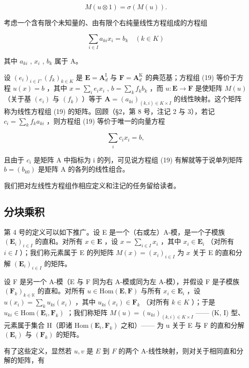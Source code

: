 \[
M (u \otimes 1) = \sigma (M (u)).
\]

考虑一个含有限个未知量的、由有限个右纯量线性方程组成的方程组

\[
\sum_ {i \in I} a _ {k i} x _ {i} = b _ {k} \quad (k \in K)\tag{19}
\]

其中 \(a_{ki}\) , \(x_{i}\) , \(b_{k}\) 属于 A。

设 \((e_i)_{i\in I}, (f_k)_{k\in K}\) 是 \(\mathbf{E} = \mathbf{A}_d^{\mathrm{I}}\) 与 \(\mathbf{F} = \mathbf{A}_d^{\mathrm{K}}\) 的典范基；方程组 (19) 等价于方程 \(u(x) = b\) ，其中 \(x = \sum_{i} e_i x_i\) , \(b = \sum_{k} f_k b_k\) ，而 \(u: \mathbf{E} \to \mathbf{F}\) 是使矩阵 \(M(u)\) （关于基 \((e_i)\) 与 \((f_k)\) ）等于 \(\mathbf{A} = (a_{ki})_{(k,i)\in K\times I}\) 的线性映射。这个矩阵称为线性方程组 (19) 的矩阵。回顾（§2，第 8 号，注记 2 与 3），若记 \(c_i = \sum_{k} f_k a_{ki}\) ，则方程组 (19) 等价于唯一的向量方程

\[
\sum_ {i} c _ {i} x _ {i} = b,\tag{20}
\]

且由于 \(c_{i}\) 是矩阵 A 中指标为 i 的列，可见说方程组 (19) 有解就等于说单列矩阵 \(b = (b_{k0})\) 是矩阵 A 的各列的线性组合。

我们把对左线性方程组作相应定义和注记的任务留给读者。

\subsection{分块乘积}

第 4 号的定义可以如下推广。设 E 是一个（右或左）A-模，是一个子模族 \((\mathbf{E}_i)_{i\in I}\) 的直和。对所有 \(x\in \mathbf{E}\) ，设 \(x = \sum_{i\in I}x_i\) ，其中 \(x_{i}\in \mathbf{E}_{i}\) （对所有 \(i\in I\) ）；我们称元素属于 E 的列矩阵 \(M(x) = (x_{i})_{i\in I}\) 为 \(x\) 关于 E 的直和分解 \((\mathbf{E}_i)_{i\in I}\) 的矩阵。

设 F 是另一个 A-模（E 与 F 同为右 A-模或同为左 A-模），并假设 F 是子模族 \((\mathbf{F}_{k})_{k\in\mathbb{K}}\) 的直和。对所有 \(u\in\mathrm{Hom}(\mathbf{E},\mathbf{F})\) 与所有 \(x_{i}\in\mathbf{E}_{i}\) ，设 \(u(x_{i})=\sum_{k}u_{ki}(x_{i})\) ，其中 \(u_{ki}(x_{i})\in\mathbf{F}_{k}\) （对所有 \(k\in K\) ）；于是 \(u_{ki}\in\mathrm{Hom}(\mathbf{E}_{i},\mathbf{F}_{k})\) ；我们称矩阵 \(M(u)=(u_{ki})_{(k,i)\in K\times I}\) —— (K, I) 型、元素属于集合 H（即诸 \(\mathrm{Hom}(\mathbf{E}_{i},\mathbf{F}_{k})\) 之和）—— 为 u 关于 E 与 F 的直和分解 \((\mathbf{E}_{i})\) 与 \((\mathbf{F}_{k})\) 的矩阵。

有了这些定义，显然若 \(u, v\) 是 \(E\) 到 \(F\) 的两个 A-线性映射，则对关于相同直和分解的矩阵，有

